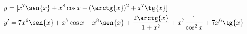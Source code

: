 \begin{ex}
\begin{align}
&y=[x^7\sen{x}+x^8\cos{x}+(\arctg{x})^2+x^7\tg{x}]\nonumber\\
&y'=7x^6\sen{x}+x^7\cos{x}+x^8\sen{x}+\frac{2\arctg{x}}{1+x^2}+x^7\frac{1}{\cos^2{x}}+7x^6\tg{x}\nonumber
\end{align}
\end{ex}